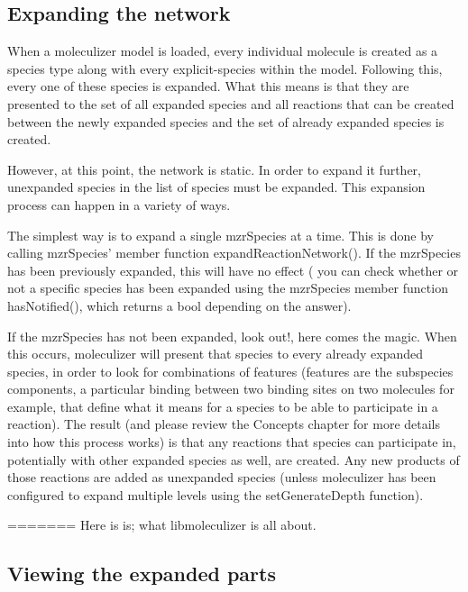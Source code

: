 \subsection{Expanding the network}
When a moleculizer model is loaded, every individual molecule is
created as a species type along with every explicit-species within the
model.  Following this, every one of these species is expanded.  What
this means is that they are presented to the set of all expanded
species and all reactions that can be created between the newly
expanded species and the set of already expanded species is created. 

However, at this point, the network is static.  In order to expand it
further, unexpanded species in the list of species must be expanded.
This expansion process can happen in a variety of ways.

The simplest way is to expand a single mzrSpecies at a time.  This is
done by calling mzrSpecies' member function expandReactionNetwork().
If the mzrSpecies has been previously expanded, this will have no
effect ( you can check whether or not a specific species has been
expanded using the mzrSpecies member function hasNotified(), which
returns a bool depending on the answer). 

If the mzrSpecies has not been expanded, look out!, here comes the
magic.  When this occurs, moleculizer will present that species to
every already expanded species, in order to look for combinations of
features (features are the subspecies components, a particular binding
between two binding sites on two molecules for example, that define
what it means for a species to be able to participate in a reaction).
The result (and please review the Concepts chapter for more details
into how this process works) is that any reactions that species can
participate in, potentially with other expanded species as well, are
created.  Any new products of those reactions are added as unexpanded
species (unless moleculizer has been configured to expand multiple
levels using the setGenerateDepth function).  


=======
Here is is; what libmoleculizer is all about.  



\subsection{Viewing the expanded parts}







